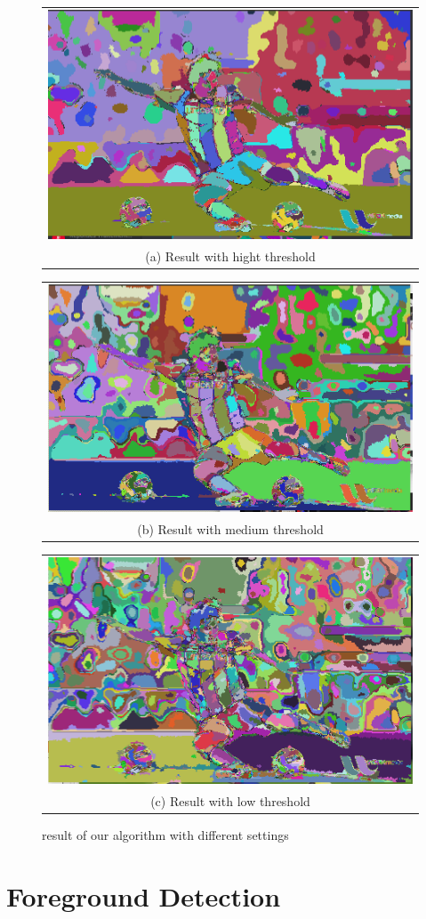 \documentclass[conference]{IEEEtran}
\begin{document}
\begin{figure}[h!]
  \centering
  \begin{tabular}{@{}c@{}}
    \includegraphics[width=0.4\linewidth]{fig7.png} \\[\abovecaptionskip]
    \small (a) Result with hight threshold
  \end{tabular}
  \begin{tabular}{@{}c@{}}
    \includegraphics[width=0.4\linewidth]{fig8.png} \\[\abovecaptionskip]
    \small (b) Result with medium  threshold
  \end{tabular}

  \vspace{\floatsep}

  \begin{tabular}{@{}c@{}}
    \includegraphics[width=0.7\linewidth]{fig9.png} \\[\abovecaptionskip]
    \small (c) Result with low threshold
  \end{tabular}
  \caption{result of our algorithm with different settings}
  \label{fig 2}
  
\end{figure}


\section{Foreground Detection}
\end{document}
